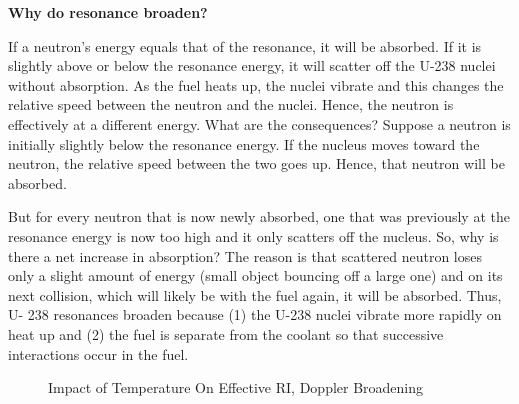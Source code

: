 \documentclass{school-22.211-notes}
\begin{document}
\textbf{Why do resonance broaden?} 

If a neutron's energy equals that of the resonance, it will be absorbed. If it is
slightly above or below the resonance energy, it will scatter off the U-238 nuclei
without absorption. As the fuel heats up, the nuclei vibrate and this changes the
relative speed between the neutron and the nuclei. Hence, the neutron is
effectively at a different energy. What are the consequences? Suppose a neutron
is initially slightly below the resonance energy. If the nucleus moves toward the
neutron, the relative speed between the two goes up. Hence, that neutron will be
absorbed.

But for every neutron that is now newly absorbed, one that was previously at the
resonance energy is now too high and it only scatters off the nucleus. So, why is
there a net increase in absorption? The reason is that scattered neutron loses only
a slight amount of energy (small object bouncing off a large one) and on its next
collision, which will likely be with the fuel again, it will be absorbed. Thus, U-
238 resonances broaden because (1) the U-238 nuclei vibrate more rapidly on heat
up and (2) the fuel is separate from the coolant so that successive interactions
occur in the fuel.

\begin{figure}
  \centering
  \caption{Impact of Temperature On Effective RI, Doppler Broadening} \label{Doppler}
\end{figure}
\end{document}
